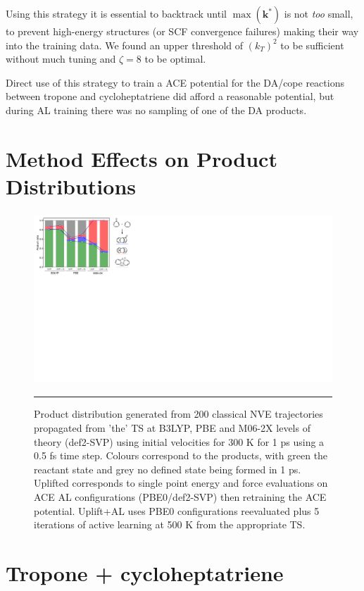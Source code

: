 \documentclass[11pt]{article}
\numberwithin{equation}{subsection}
\begin{document}
Using this strategy it is essential to backtrack until $\max(\boldsymbol{k}^*)$ is not \emph{too} small, to prevent high-energy structures (or SCF convergence failures) making their way into the training data. We found an upper threshold of $(k_T)^2$ to be sufficient without much tuning and $\zeta = 8$ to be optimal.


Direct use of this strategy to train a ACE potential for the DA/cope reactions between tropone and cycloheptatriene did afford a reasonable potential, but during AL training there was no sampling of one of the DA products.


\newpage
\section{Method Effects on Product Distributions}  \label{section::SI_method_effects_R3}


\begin{figure}[h!]
	\centering
	\vspace{0.4cm}
	\includegraphics[height=6.4cm]{figSX31.pdf}
	\vspace{0.1cm}
	\hrule
	\vspace{0.1cm}
	\caption{Product distribution generated from 200 classical NVE trajectories propagated from 'the' TS at B3LYP, PBE and M06-2X levels of theory (def2-SVP) using initial velocities for 300 K for 1 ps using a 0.5 fs time step. Colours correspond to the products, with green the reactant state and grey no defined state being formed in 1 ps. Uplifted corresponds to single point energy and force evaluations on ACE AL configurations (PBE0/def2-SVP) then retraining the ACE potential. Uplift+AL uses PBE0 configurations reevaluated plus 5 iterations of active learning at 500 K from the appropriate TS.
}
	\label{fig::SX31}
\end{figure}

\clearpage
\section{Tropone + cycloheptatriene} \label{section::SI_accuracy_R3}
\end{document}
